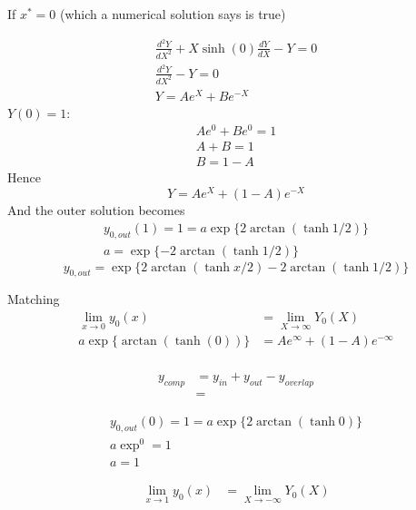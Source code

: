 \documentclass{/home/janmebows/Documents/LatexTemplates/myassignment}
\begin{document}
\begin{enumerate}
\begin{enumerate}
		If $x^* = 0$ (which a numerical solution says is true)

		\begin{align*}
			\frac{d^2Y}{dX^2} + X\sinh(0) \frac{dY}{dX} - Y = 0\\
			\frac{d^2Y}{dX^2} - Y = 0\\
			Y = Ae^{X} + Be^{-X}
		\end{align*}
		$Y(0) = 1$:
		\begin{align*}
			Ae^{0} + Be^{0} = 1\\
			A+B =1\\
			B = 1-A
		\end{align*}
		Hence
		\[\boxed{Y = Ae^{X} + (1-A)e^{-X}}\]
		And the outer solution becomes
		\begin{align*}
			y_{0,out}(1) = 1 = a\exp\{2\arctan\left(\tanh 1/2\right)\}\\
			a = \exp\{-2\arctan\left(\tanh 1/2\right)\}
		\end{align*}
		\[\boxed{y_{0,out} =\exp\{2\arctan\left(\tanh x/2\right) -2\arctan\left(\tanh 1/2\right) \} } \]

		Matching
		\begin{align*}
			\lim_{x\to 0} y_0(x) &= \lim_{X \to \infty} Y_0(X)\\
			a\exp\{\arctan(\tanh(0))\} &= Ae^{\infty} + (1-A)e^{-\infty}\\
		\end{align*}

		\begin{align*}
			y_{comp} &= y_{in} + y_{out} - y_{overlap}\\
			&=
		\end{align*}


		\begin{align*}
			y_{0,out}(0) = 1 = a\exp\{2\arctan\left(\tanh 0\right)\}\\
			a \exp^0 = 1 \\
			a = 1
		\end{align*}




		\begin{align*}
			\lim_{x\to 1} y_0(x) &= \lim_{X \to -\infty} Y_0(X)\\
		\end{align*}


\end{enumerate}
\end{enumerate}
\end{document}
